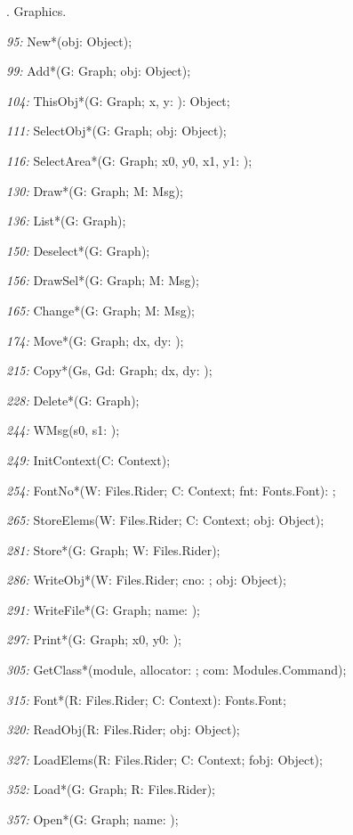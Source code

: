. Graphics.

\item{\it 95:} New*(obj: Object);
\item{\it 99:} Add*(G: Graph; obj: Object);
\item{\it 104:} ThisObj*(G: Graph; x, y: \INTEGER): Object;
\item{\it 111:} SelectObj*(G: Graph; obj: Object);
\item{\it 116:} SelectArea*(G: Graph; x0, y0, x1, y1: \INTEGER);
\item{\it 130:} Draw*(G: Graph; \VAR M: Msg);
\item{\it 136:} List*(G: Graph);
\item{\it 150:} Deselect*(G: Graph);
\item{\it 156:} DrawSel*(G: Graph; \VAR M: Msg);
\item{\it 165:} Change*(G: Graph; \VAR M: Msg);
\item{\it 174:} Move*(G: Graph; dx, dy: \INTEGER);
\item{\it 215:} Copy*(Gs, Gd: Graph; dx, dy: \INTEGER);
\item{\it 228:} Delete*(G: Graph);
\item{\it 244:} WMsg(s0, s1: \ARRAYOF\CHAR);
\item{\it 249:} InitContext(\VAR C: Context);
\item{\it 254:} FontNo*(\VAR W: Files.Rider; \VAR C: Context; fnt: Fonts.Font): \INTEGER;
\item{\it 265:} StoreElems(\VAR W: Files.Rider; \VAR C: Context; obj: Object);
\item{\it 281:} Store*(G: Graph; \VAR W: Files.Rider);
\item{\it 286:} WriteObj*(\VAR W: Files.Rider; cno: \INTEGER; obj: Object);
\item{\it 291:} WriteFile*(G: Graph; name: \ARRAYOF\CHAR);
\item{\it 297:} Print*(G: Graph; x0, y0: \INTEGER);
\item{\it 305:} GetClass*(module, allocator: \ARRAYOF\CHAR; \VAR com: Modules.Command);
\item{\it 315:} Font*(\VAR R: Files.Rider; \VAR C: Context): Fonts.Font;
\item{\it 320:} ReadObj(\VAR R: Files.Rider; obj: Object);
\item{\it 327:} LoadElems(\VAR R: Files.Rider; \VAR C: Context; \VAR fobj: Object);
\item{\it 352:} Load*(G: Graph; \VAR R: Files.Rider);
\item{\it 357:} Open*(G: Graph; name: \ARRAYOF\CHAR);
